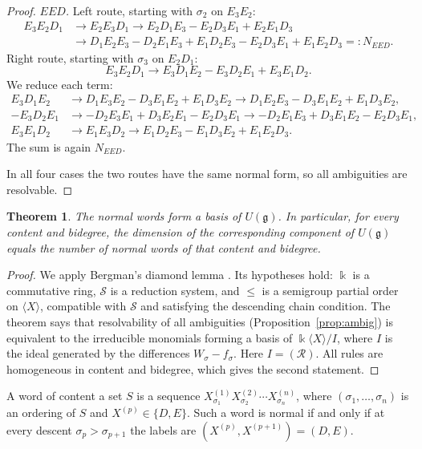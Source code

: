 \documentclass[11pt]{amsart}
\newtheorem{theorem}{Theorem}[section]
\theoremstyle{definition}
\theoremstyle{remark}
\newcommand{\kk}{\Bbbk}
\newcommand{\g}{\mathfrak{g}}
\begin{document}
\begin{proof}
\emph{$EED$.} Left route, starting with $\sigma_2$ on $E_3E_2$:
\begin{align*}
E_3E_2D_1&\to E_2E_3D_1\to E_2D_1E_3-E_2D_3E_1+E_2E_1D_3\\
&\to D_1E_2E_3-D_2E_1E_3+E_1D_2E_3-E_2D_3E_1+E_1E_2D_3=:N_{EED}.
\end{align*}
Right route, starting with $\sigma_3$ on $E_2D_1$:
\[
E_3E_2D_1\to E_3D_1E_2-E_3D_2E_1+E_3E_1D_2.
\]
We reduce each term:
\begin{align*}
E_3D_1E_2&\to D_1E_3E_2-D_3E_1E_2+E_1D_3E_2\to D_1E_2E_3-D_3E_1E_2+E_1D_3E_2,\\
-E_3D_2E_1&\to -D_2E_3E_1+D_3E_2E_1-E_2D_3E_1\to -D_2E_1E_3+D_3E_1E_2-E_2D_3E_1,\\
E_3E_1D_2&\to E_1E_3D_2\to E_1D_2E_3-E_1D_3E_2+E_1E_2D_3.
\end{align*}
The sum is again $N_{EED}$.

In all four cases the two routes have the same normal form, so all ambiguities are resolvable.
\end{proof}

\begin{theorem}\label{thm:pbw}
The normal words form a basis of $U(\g)$. In particular, for every content and bidegree, the dimension of the corresponding component of $U(\g)$ equals the number of normal words of that content and bidegree.
\end{theorem}

\begin{proof}
We apply Bergman's diamond lemma \cite[Theorem~1.2]{Ber}. Its hypotheses hold: $\kk$ is a commutative ring, $\mathcal S$ is a reduction system, and $\le$ is a semigroup partial order on $\langle X\rangle$, compatible with $\mathcal S$ and satisfying the descending chain condition. The theorem says that resolvability of all ambiguities (Proposition~\ref{prop:ambig}) is equivalent to the irreducible monomials forming a basis of $\kk\langle X\rangle/I$, where $I$ is the ideal generated by the differences $W_\sigma-f_\sigma$. Here $I=(\mathcal R)$. All rules are homogeneous in content and bidegree, which gives the second statement.
\end{proof}

A word of content a set $S$ is a sequence $X^{(1)}_{\sigma_1}X^{(2)}_{\sigma_2}\cdots X^{(n)}_{\sigma_n}$, where $(\sigma_1,\dots,\sigma_n)$ is an ordering of $S$ and $X^{(p)}\in\{D,E\}$. Such a word is normal if and only if at every descent $\sigma_p>\sigma_{p+1}$ the labels are $(X^{(p)},X^{(p+1)})=(D,E)$.
\end{document}
